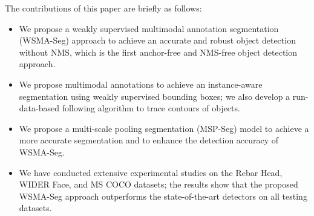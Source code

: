 \documentclass{article}
\begin{document}
The contributions of this paper are briefly  as follows: 
\begin{itemize}
  \item We propose a weakly supervised multimodal annotation segmentation (WSMA-Seg) approach to achieve an accurate and robust object detection without NMS, which is the first anchor-free and NMS-free object detection approach. 
  \item We propose multimodal annotations to achieve an instance-aware segmentation using weakly supervised bounding boxes; we also 
develop a run-data-based following 
algorithm  to trace contours of objects. 
  \item We propose a multi-scale pooling segmentation (MSP-Seg) model  to achieve a more accurate segmentation and to enhance the detection accuracy of WSMA-Seg.
  \item  We have conducted extensive experimental studies  on the Rebar Head, WIDER Face, and MS COCO datasets; the results show that the proposed WSMA-Seg approach outperforms the state-of-the-art detectors on all testing datasets.
\end{itemize}
\end{document}
